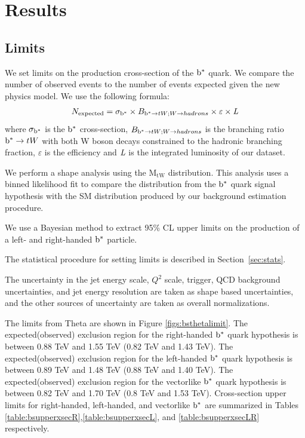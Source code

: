 \clearpage
\newpage
\chapter{Results}
\section{Limits}
\label{sec:bsstats}
We set limits on the production cross-section of 
the $\mathrm{b}^{*}$ quark. We compare the number 
of observed events to the number of events expected given the new physics model. We use the following formula:
\begin{eqnarray}
N_{\textrm{expected}} = \sigma_{\mathrm{b}^{*}} \times B_{\mathrm{b}^{*} \rightarrow tW;W \to hadrons} \times \varepsilon \times \emph{L}
\end{eqnarray}
where $\sigma_{\mathrm{b}^{*}}$ is the $\mathrm{b}^{*}$ cross-section, $B_{\mathrm{b}^{*} \rightarrow tW;W \to hadrons}$ is the branching ratio 
$\mathrm{b}^{*} \to tW$ with both W boson decays constrained to the hadronic branching fraction, $\varepsilon$ is the efficiency and $\emph{L}$ is the integrated luminosity of our dataset. 

We perform a shape analysis using the $\mathrm{M_{tW}}$ distribution.  This analysis uses a binned likelihood fit to compare the distribution from the $\mathrm{b}^{*}$ quark signal 
hypothesis with the SM distribution produced by our background estimation procedure.  

\label{sec:bsTheta}
We use a Bayesian method to extract 95\% CL upper limits 
on the production of a left- and right-handed $\mathrm{b}^{*}$ particle.  

The statistical procedure for setting limits is described in Section~\ref{sec:stats}. 

The uncertainty in the jet energy scale, $Q^2$ scale, trigger, QCD background uncertainties, and jet energy resolution are taken 
as shape based uncertainties, and the other sources of uncertainty are taken as overall normalizations.  

The limits from Theta are shown in Figure \ref{figs:bsthetalimit}.  
The expected(observed) exclusion region for the right-handed $\mathrm{b}^{*}$ quark hypothesis is between 0.88 TeV and 1.55 TeV (0.82 TeV and 1.43 TeV).  
The expected(observed) exclusion region for the left-handed $\mathrm{b}^{*}$ quark hypothesis is between 0.89 TeV and 1.48 TeV (0.88 TeV and 1.40 TeV).  
The expected(observed) exclusion region for the vectorlike $\mathrm{b}^{*}$ quark hypothesis is between 0.82 TeV and 1.70 TeV (0.8 TeV and 1.53 TeV).  Cross-section upper limits for 
right-handed, left-handed, and vectorlike $\mathrm{b}^{*}$ are summarized in Tables \ref{table:bsupperxsecR},\ref{table:bsupperxsecL}, and \ref{table:bsupperxsecLR} respectively. 


